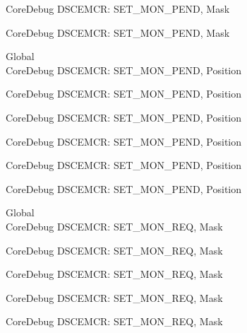 \begin{DoxyRefList}
\label{deprecated__deprecated001207}%
%
Core\+Debug DSCEMCR\+: SET\+\_\+\+MON\+\_\+\+PEND, Mask 

\label{deprecated__deprecated001309}%
%
Core\+Debug DSCEMCR\+: SET\+\_\+\+MON\+\_\+\+PEND, Mask  
\item[Global \doxylink{group___c_m_s_i_s___s_c_b_ga644ae3a13bcb9f2a80326bc5824f1b28}{Core\+Debug\+\_\+\+DSCEMCR\+\_\+\+SET\+\_\+\+MON\+\_\+\+PEND\+\_\+\+Pos} ]\hfill \\
\label{deprecated__deprecated000077}%
%
Core\+Debug DSCEMCR\+: SET\+\_\+\+MON\+\_\+\+PEND, Position 

\label{deprecated__deprecated000528}%
%
Core\+Debug DSCEMCR\+: SET\+\_\+\+MON\+\_\+\+PEND, Position 

\label{deprecated__deprecated000630}%
%
Core\+Debug DSCEMCR\+: SET\+\_\+\+MON\+\_\+\+PEND, Position 

\label{deprecated__deprecated000755}%
%
Core\+Debug DSCEMCR\+: SET\+\_\+\+MON\+\_\+\+PEND, Position 

\label{deprecated__deprecated001206}%
%
Core\+Debug DSCEMCR\+: SET\+\_\+\+MON\+\_\+\+PEND, Position 

\label{deprecated__deprecated001308}%
%
Core\+Debug DSCEMCR\+: SET\+\_\+\+MON\+\_\+\+PEND, Position  
\item[Global \doxylink{group___c_m_s_i_s___s_c_b_ga73d8960abbd67eeda64f27a77ed7baf2}{Core\+Debug\+\_\+\+DSCEMCR\+\_\+\+SET\+\_\+\+MON\+\_\+\+REQ\+\_\+\+Msk} ]\hfill \\
\label{deprecated__deprecated000076}%
%
Core\+Debug DSCEMCR\+: SET\+\_\+\+MON\+\_\+\+REQ, Mask 

\label{deprecated__deprecated000527}%
%
Core\+Debug DSCEMCR\+: SET\+\_\+\+MON\+\_\+\+REQ, Mask 

\label{deprecated__deprecated000629}%
%
Core\+Debug DSCEMCR\+: SET\+\_\+\+MON\+\_\+\+REQ, Mask 

\label{deprecated__deprecated000754}%
%
Core\+Debug DSCEMCR\+: SET\+\_\+\+MON\+\_\+\+REQ, Mask 

\label{deprecated__deprecated001205}%
%
Core\+Debug DSCEMCR\+: SET\+\_\+\+MON\+\_\+\+REQ, Mask 


\end{DoxyRefList}
